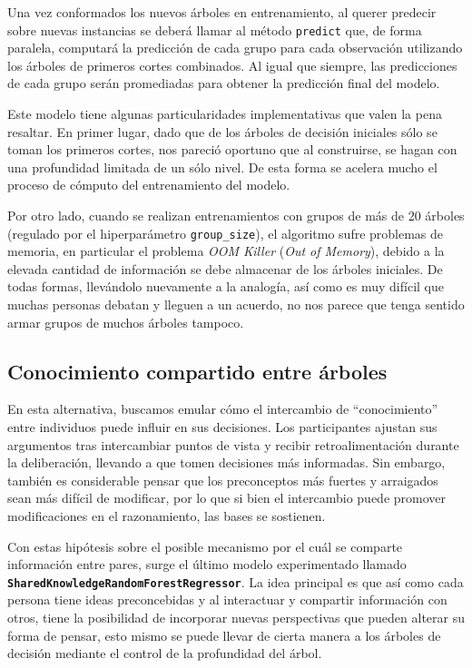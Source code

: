 Una vez conformados los nuevos árboles en entrenamiento, al querer predecir sobre nuevas instancias se deberá llamar al método \texttt{predict} que, de forma paralela, computará la predicción de cada grupo para cada observación utilizando los árboles de primeros cortes combinados. Al igual que siempre, las predicciones de cada grupo serán promediadas para obtener la predicción final del modelo.

Este modelo tiene algunas particularidades implementativas que valen la pena resaltar. En primer lugar, dado que de los árboles de decisión iniciales sólo se toman los primeros cortes, nos pareció oportuno que al construirse, se hagan con una profundidad limitada de un sólo nivel. De esta forma se acelera mucho el proceso de cómputo del entrenamiento del modelo.

Por otro lado, cuando se realizan entrenamientos con grupos de más de 20 árboles (regulado por el hiperparámetro \texttt{group\_size}), el algoritmo sufre problemas de memoria, en particular el problema \textit{OOM Killer} (\textit{Out of Memory}), debido a la elevada cantidad de información se debe almacenar de los árboles iniciales. De todas formas, llevándolo nuevamente a la analogía, así como es muy difícil que muchas personas debatan y lleguen a un acuerdo, no nos parece que tenga sentido armar grupos de muchos árboles tampoco.

\subsection{Conocimiento compartido entre árboles}

En esta alternativa, buscamos emular cómo el intercambio de “conocimiento” entre individuos puede influir en sus decisiones. Los participantes ajustan sus argumentos tras intercambiar puntos de vista y recibir retroalimentación durante la deliberación, llevando a que tomen decisiones más informadas. Sin embargo, también es considerable pensar que los preconceptos más fuertes y arraigados sean más difícil de modificar, por lo que si bien el intercambio puede promover modificaciones en el razonamiento, las bases se sostienen.

Con estas hipótesis sobre el posible mecanismo por el cuál se comparte información entre pares, surge el último modelo experimentado llamado \textbf{\texttt{SharedKnowledgeRandomForestRegressor}}. La idea principal es que así como cada persona tiene ideas preconcebidas y al interactuar y compartir información con otros, tiene la posibilidad de incorporar nuevas perspectivas que pueden alterar su forma de pensar, esto mismo se puede llevar de cierta manera a los árboles de decisión mediante el control de la profundidad del árbol.

